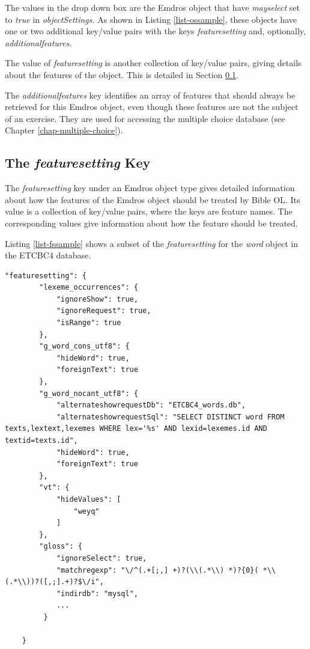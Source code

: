\documentclass[11pt,oneside,a4paper]{memoir}
\begin{document}
The values in the drop down box are the Emdros object that have \emph{mayselect} set to \emph{true}
in \emph{objectSettings.} As shown in Listing \ref{list-ossample}, these objects have one or
two additional key/value pairs with the keys \emph{featuresetting} and, optionally,
\emph{additionalfeatures.}

The value of \emph{featuresetting} is another collection of key/value pairs, giving
details about the features of the object. This is detailed in Section \ref{sec-featuresetting}.

The \emph{additionalfeatures} key identifies an array of features that should always be retrieved
for this Emdros object, even though these features are not the subject of an exercise. They are used
for accessing the multiple choice database (see Chapter \ref{chap-multiple-choice}).

\subsection{The \emph{featuresetting} Key}\label{sec-featuresetting}

The \emph{featuresetting} key under an Emdros object type gives detailed information about how the
features of the Emdros object should be treated by Bible OL. Its value is a collection of key/value
pairs, where the keys are feature names. The corresponding values give
information about how the feature should be treated.

Listing \ref{list-fssample} shows a subset of the \emph{featuresetting} for the \emph{word} object
in the ETCBC4 database.

\begin{lstlisting}[escapechar=\#,caption=A sample featuresetting value,label=list-fssample]
    "featuresetting": {
        "lexeme_occurrences": {
            "ignoreShow": true,
            "ignoreRequest": true,
            "isRange": true
        },
        "g_word_cons_utf8": {
            "hideWord": true,
            "foreignText": true
        },
        "g_word_nocant_utf8": {
            "alternateshowrequestDb": "ETCBC4_words.db",
            "alternateshowrequestSql": "SELECT DISTINCT word FROM texts,lextext,lexemes WHERE lex='%s' AND lexid=lexemes.id AND textid=texts.id",
            "hideWord": true,
            "foreignText": true
        },
        "vt": {
            "hideValues": [
                "weyq"
            ]
        },
        "gloss": {
            "ignoreSelect": true,
            "matchregexp": "\/^(.+[;,] +)?(\\(.*\\) *)?{0}( *\\(.*\\))?([,;].+)?$\/i",
            "indirdb": "mysql",
            ...
         }

    }
\end{lstlisting}
\end{document}
